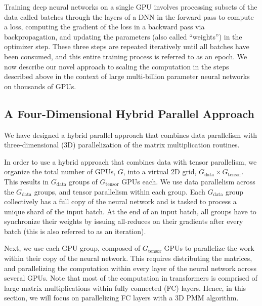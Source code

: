 

Training deep neural networks on a single GPU involves processing subsets of
the data called batches through the layers of a DNN in the forward pass to
compute a loss, computing the gradient of the loss in a backward pass via
backpropagation, and updating the parameters (also called ``weights'') in the
optimizer step. These three steps are repeated iteratively until all batches
have been consumed, and this entire training process is referred to as an
epoch. We now describe our novel approach to scaling the computation in the
steps described above in the context of large multi-billion parameter neural
networks on thousands of GPUs.

\subsection{A Four-Dimensional Hybrid Parallel Approach}
\label{sec:hybrid}

We have designed a hybrid parallel approach that combines data parallelism with
three-dimensional (3D) parallelization of the matrix multiplication routines.

\vspace{0.08in}
In order to use a hybrid approach that combines data with tensor
parallelism, we organize the total number of GPUs, $G$, into a virtual 2D
grid, $G_{\mathrm{data}} \times G_{\mathrm{tensor}}$. This results in
$G_{\mathrm{data}}$ groups of $G_{\mathrm{tensor}}$ GPUs each. We use data
parallelism across the $G_{\mathrm{data}}$ groups, and tensor parallelism
within each group. Each $G_{\mathrm{data}}$ group collectively has a full copy of the neural
network and is tasked to process a unique shard of the input batch. At the end of an input batch,
all groups have to synchronize their weights by issuing all-reduces
on their gradients after every batch (this is also referred to as an
iteration).

\vspace{0.08in}
Next, we use each GPU group, composed of $G_{\mathrm{tensor}}$ GPUs to
parallelize the work within their copy of the neural network.  This requires
distributing the matrices, and parallelizing the computation within every layer
of the neural network across several GPUs. Note that most of the computation in 
transformers is comprised of large matrix multiplications within fully connected (FC) layers.
Hence, in this section, we will focus on parallelizing FC layers with a 3D 
PMM algorithm.

